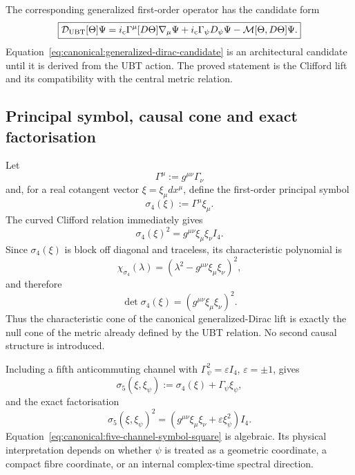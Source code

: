 The corresponding generalized first-order operator has the candidate form
\begin{equation}
 \boxed{
 \mathcal D_{\rm UBT}[\Theta]\Psi
 =i_{\rm c}\Gamma^\mu[D\Theta]\nabla_\mu\Psi
  +i_{\rm c}\Gamma_\psi D_\psi\Psi
  -\mathcal M[\Theta,D\Theta]\Psi.}
 \label{eq:canonical:generalized-dirac-candidate}
\end{equation}
Equation~\eqref{eq:canonical:generalized-dirac-candidate} is an architectural
candidate until it is derived from the UBT action.  The proved statement is
the Clifford lift and its compatibility with the central metric relation.


\subsection{Principal symbol, causal cone and exact factorisation}
Let
\begin{equation}
 \Gamma^\mu:=g^{\mu\nu}\Gamma_\nu
\end{equation}
and, for a real cotangent vector $\xi=\xi_\mu dx^\mu$, define the
first-order principal symbol
\begin{equation}
 \sigma_4(\xi):=\Gamma^\mu\xi_\mu.
\end{equation}
The curved Clifford relation immediately gives
\begin{equation}
 \boxed{
 \sigma_4(\xi)^2
 =g^{\mu\nu}\xi_\mu\xi_\nu I_4.}
 \label{eq:canonical:principal-symbol-square}
\end{equation}
Since $\sigma_4(\xi)$ is block off diagonal and traceless, its characteristic
polynomial is
\begin{equation}
 \chi_{\sigma_4}(\lambda)
 =\left(\lambda^2-g^{\mu\nu}\xi_\mu\xi_\nu\right)^2,
\end{equation}
and therefore
\begin{equation}
 \boxed{
 \det\sigma_4(\xi)
 =\left(g^{\mu\nu}\xi_\mu\xi_\nu\right)^2.}
 \label{eq:canonical:principal-symbol-determinant}
\end{equation}
Thus the characteristic cone of the canonical generalized-Dirac lift is
exactly the null cone of the metric already defined by the UBT relation.  No
second causal structure is introduced.

Including a fifth anticommuting channel with
$\Gamma_\psi^2=\varepsilon I_4$, $\varepsilon=\pm1$, gives
\begin{equation}
 \sigma_5(\xi,\xi_\psi)
 :=\sigma_4(\xi)+\Gamma_\psi\xi_\psi,
\end{equation}
and the exact factorisation
\begin{equation}
 \boxed{
 \sigma_5(\xi,\xi_\psi)^2
 =\left(g^{\mu\nu}\xi_\mu\xi_\nu
       +\varepsilon\xi_\psi^2\right)I_4.}
 \label{eq:canonical:five-channel-symbol-square}
\end{equation}
Equation~\eqref{eq:canonical:five-channel-symbol-square} is algebraic.  Its
physical interpretation depends on whether $\psi$ is treated as a geometric
coordinate, a compact fibre coordinate, or an internal complex-time spectral
direction.

